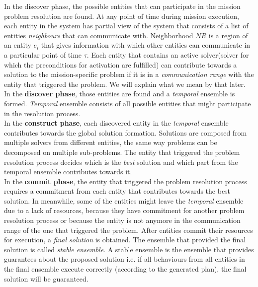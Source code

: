 \documentclass[journal]{IEEEtran}
\theoremstyle{definition}
\newcommand\darko[1]{\nb{Darko}{#1}}
\begin{document}
 In the discover phase,  %
 the possible entities that can participate in the mission problem resolution are found. At any point of time during mission execution, each entity in the system has partial view of the system that consists of a list of entities \textit{neighbours} that can communicate with. Neighborhood $NR$ is a region of an entity $e_i$ that gives information with which other entities can communicate in a particular point of time $\tau$.
 Each entity that contains an active solver(solver for which the preconditions for activation are fulfilled) %
 can contribute towards a solution to the mission-specific problem if it is in a \textit{communication range} with the entity that triggered the problem. We will explain what we mean by that later. \\
 In the \textbf{discover phase}, those entities are found
 and a \textit{temporal} ensemble is formed. \textit{Temporal} ensemble consists of all possible entities that might participate in the resolution process.\\
 In the \textbf{construct phase}, each discovered entity in the \textit{temporal} ensemble contributes towards the global solution formation.
 Solutions are composed from multiple solvers from different entities, the same way problems can be decomposed on multiple sub-problems. The entity that triggered the problem resolution process  decides which is the \textit{best} solution and which part from the temporal ensemble contributes towards it.\\
In the \textbf{commit phase}, the entity that triggered the problem resolution process requires a commitment from each entity that contributes towards the best solution.
In meanwhile, some of the entities might leave the \textit{temporal} ensemble due to a lack of resources, because they have commitment for another problem resolution process or because the entity is not anymore in the communication range of the one that triggered the problem\darko{this is not in the code}.
After entities commit their resources for execution, a \textit{final solution} is obtained. The ensemble that provided the final solution is called \textit{stable ensemble}. A stable ensemble is the ensemble that provides guarantees about the proposed solution i.e. if all behaviours from all entities in the final ensemble execute correctly (according to the generated plan), the final solution will be guaranteed.
\end{document}

